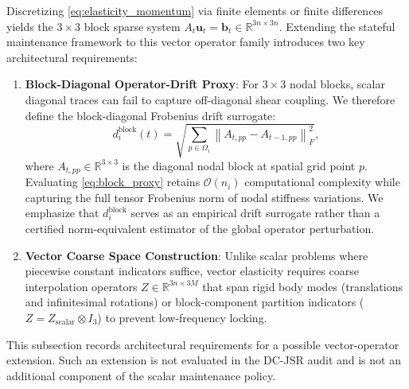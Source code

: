 \documentclass[preprint,12pt,3p]{elsarticle}
\begin{document}
Discretizing \eqref{eq:elasticity_momentum} via finite elements or finite differences yields the $3 \times 3$ block sparse system $A_t \boldsymbol{u}_t = \boldsymbol{b}_t \in \mathbb{R}^{3n \times 3n}$. Extending the stateful maintenance framework to this vector operator family introduces two key architectural requirements:
\begin{enumerate}
    \item \textbf{Block-Diagonal Operator-Drift Proxy}: For $3 \times 3$ nodal blocks, scalar diagonal traces can fail to capture off-diagonal shear coupling. We therefore define the block-diagonal Frobenius drift surrogate:
    \begin{equation}
    d_i^{\text{block}}(t) = \sqrt{\sum_{p \in \Omega_i} \left\| A_{t, pp} - A_{t-1, pp} \right\|_F^2},
    \label{eq:block_proxy}
    \end{equation}
    where $A_{t, pp} \in \mathbb{R}^{3 \times 3}$ is the diagonal nodal block at spatial grid point $p$. Evaluating \eqref{eq:block_proxy} retains $\mathcal{O}(n_i)$ computational complexity while capturing the full tensor Frobenius norm of nodal stiffness variations. We emphasize that $d_i^{\text{block}}$ serves as an empirical drift surrogate rather than a certified norm-equivalent estimator of the global operator perturbation.
    \item \textbf{Vector Coarse Space Construction}: Unlike scalar problems where piecewise constant indicators suffice, vector elasticity requires coarse interpolation operators $Z \in \mathbb{R}^{3n \times 3M}$ that span rigid body modes (translations and infinitesimal rotations) or block-component partition indicators ($Z = Z_{\text{scalar}} \otimes I_3$) to prevent low-frequency locking.
\end{enumerate}
This subsection records architectural requirements for a possible vector-operator extension. Such an extension is not evaluated in the DC-JSR audit and is not an additional component of the scalar maintenance policy.
\end{document}
